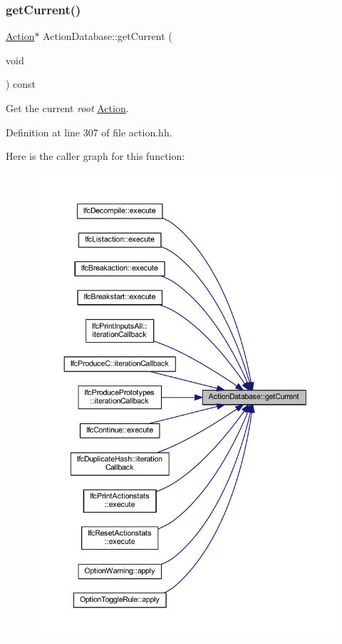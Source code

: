 \subsubsection{\texorpdfstring{getCurrent()}{getCurrent()}}
{\footnotesize\ttfamily \mbox{\hyperlink{class_action}{Action}}$\ast$ Action\+Database\+::get\+Current (\begin{DoxyParamCaption}\item[{void}]{ }\end{DoxyParamCaption}) const\hspace{0.3cm}{\ttfamily [inline]}}



Get the current {\itshape root} \mbox{\hyperlink{class_action}{Action}}. 



Definition at line 307 of file action.\+hh.

Here is the caller graph for this function\+:
\nopagebreak
\begin{figure}[H]
\begin{center}
\leavevmode
\includegraphics[width=350pt]{class_action_database_af5fcde4af3947f6e02fd7fd4cf9e2ecc_icgraph}
\end{center}
\end{figure}
\mbox{\label{class_action_database_ae68921ffe5175dad6b6b1f2e44c77d6b}} 
